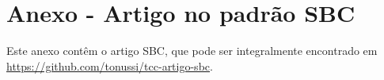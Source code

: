 \chapter{Anexo - Artigo no padrão SBC}

Este anexo contêm o artigo SBC, que pode ser integralmente encontrado em \url{https://github.com/tonussi/tcc-artigo-sbc}.

